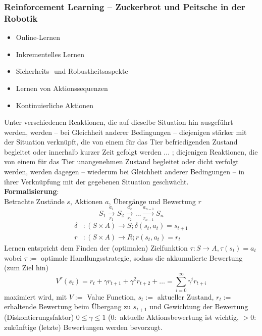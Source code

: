 \subsubsection{Reinforcement Learning -- Zuckerbrot und Peitsche in der Robotik}
\begin{itemize}
	\item Online-Lernen
	\item Inkrementelles Lernen
	\item Sicherheits- und Robustheitsaspekte
	\item Lernen von Aktionssequenzen
	\item Kontinuierliche Aktionen
\end{itemize}
Unter verschiedenen Reaktionen, die auf dieselbe Situation hin ausgeführt werden, werden -- bei Gleichheit anderer Bedingungen -- diejenigen stärker mit der Situation verknüpft, die von einem für das Tier befriedigenden Zustand begleitet oder innerhalb kurzer Zeit gefolgt werden ... ; diejenigen Reaktionen, die von einem für das Tier unangenehmen Zustand begleitet oder dicht verfolgt werden, werden dagegen -- wiederum bei Gleichheit anderer Bedingungen -- in ihrer Verknüpfung mit der gegebenen Situation geschwächt.\\
%
\textbf{Formalisierung}:\\
Betrachte Zustände $s$, Aktionen $a$, Übergänge und Bewertung $r$
\begin{equation}
	S_1 \overset{a_1}{\underset{r_1}{\rightarrow}} S_2 \overset{a_2}{\underset{r_2}{\rightarrow}} \ldots \overset{a_{n-1}}{\underset{r_{n-1}}{\rightarrow}} S_n
\end{equation}
\begin{align}
	\delta &: \left(S \times A \right) \rightarrow S ; \delta \left(s_t, a_t\right) = s_{t + 1} \\
	r &: \left(S \times A \right) \rightarrow R ; r\left(s_t, a_t\right) = r_t
\end{align}
Lernen entspricht dem Finden der (optimalen) Zielfunktion $\tau:S\rightarrow A, \tau(s_t)=a_t$ wobei $\tau:=$ optimale Handlungsstrategie, sodass die akkumulierte Bewertung (zum Ziel hin) 
\begin{equation}
V^{\tau}(s_t) = r_t + \gamma r_{t+1} + \gamma^2 r_{t+2} + \ldots = \sum_{i = 0}^\infty \gamma^i r_{t+i}
\end{equation}
maximiert wird, mit $V:=$ Value Function, $s_t:=$ aktueller Zustand, $r_t:=$ erhaltende Bewertung beim Übergang zu $s_{t+1}$ und Gewichtung der Bewertung (Diskontierungsfaktor) $0 \leq \gamma \leq 1$ ($0:$ aktuelle Aktionsbewertung ist wichtig, $>0:$ zukünftige (letzte) Bewertungen werden bevorzugt.

